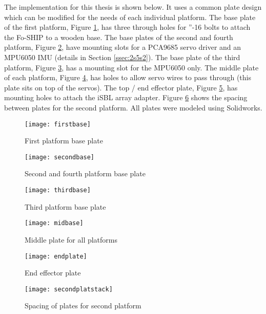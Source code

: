 \documentclass[11pt]{ucthesisCP}
\begin{document}
The implementation for this thesis is shown below. It uses a common plate design which can be modified for the needs of each individual platform. The base plate of the first platform, Figure \ref{fig:firstbase}, has three through holes for ”-16 bolts to attach the Fo-SHIP to a wooden base. The base plates of the second and fourth platform, Figure \ref{fig:secondbase}, have mounting slots for a PCA9685 servo driver and an MPU6050 IMU (details in Section \ref{ssec:2s5s2}). The base plate of the third platform, Figure \ref{fig:thirdbase}, has a mounting slot for the MPU6050 only. The middle plate of each platform, Figure \ref{fig:midbase}, has holes to allow servo wires to pass through (this plate sits on top of the servos). The top / end effector plate, Figure \ref{fig:endplate}, has mounting holes to attach the iSBL array adapter. Figure \ref{fig:secondplatstack} shows the spacing between plates for the second platform. All plates were modeled using Solidworks\textsuperscript{\textregistered}\xspace.

\begin{figure}[htbp]
	\centering
	\texttt{[image: firstbase]}
	\caption{First platform base plate}
	\label{fig:firstbase}
\end{figure}

\begin{figure}[htbp]
	\centering
	\texttt{[image: secondbase]}
	\caption{Second and fourth platform base plate}
	\label{fig:secondbase}
\end{figure}

\begin{figure}[htbp]
	\centering
	\texttt{[image: thirdbase]}
	\caption{Third platform base plate}
	\label{fig:thirdbase}
\end{figure}

\begin{figure}[htbp]
	\centering
	\texttt{[image: midbase]}
	\caption{Middle plate for all platforms}
	\label{fig:midbase}
\end{figure}

\begin{figure}[htbp]
	\centering
	\texttt{[image: endplate]}
	\caption{End effector plate}
	\label{fig:endplate}
\end{figure}

\begin{figure}[htbp]
	\centering
	\texttt{[image: secondplatstack]}
	\caption{Spacing of plates for second platform}
	\label{fig:secondplatstack}
\end{figure}
\end{document}
